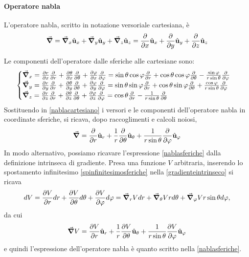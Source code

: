 \paragraph{Operatore nabla}
\begin{remember}
	L'operatore nabla, scritto in notazione versoriale cartesiana, è
	\begin{equation*}
		\grad =\grad_x\hat{\mathbf{u}}_x+\grad_y\hat{\mathbf{u}}_y+\grad_z\hat{\mathbf{u}}_z=\pdv{x}\hat{\mathbf{u}}_x+\pdv{y}\hat{\mathbf{u}}_y+\pdv{z}\hat{\mathbf{u}}_z
	\end{equation*}
\end{remember}
Le componenti dell'operatore dalle sferiche alle cartesiane sono:
\begin{equation}
	\begin{cases}
		\grad_x=\pdv{r}{x}\pdv{r}+\pdv{\theta}{x}\pdv{\theta}+\pdv{\varphi}{x}\pdv{\varphi}=\sin\theta\cos\varphi\pdv{r}+\cos\theta\cos\varphi\pdv{\theta}-\frac{\sin\varphi}{r\sin\theta}\pdv{\varphi}\\
		\grad_y=\pdv{r}{y}\pdv{r}+\pdv{\theta}{y}\pdv{\theta}+\pdv{\varphi}{y}\pdv{\varphi}=\sin\theta\sin\varphi\pdv{r}+\cos\theta\sin\varphi\pdv{\theta}+\frac{\cos\varphi}{r\sin\theta}\pdv{\varphi}\\
		\grad_z=\pdv{r}{z}\pdv{r}+\pdv{\theta}{z}\pdv{\theta}+\pdv{\varphi}{z}\pdv{\varphi}=\cos\theta\pdv{r}-\frac{1}{r\sin\theta}\pdv{\theta}\end{cases}
\end{equation}
Sostituendo in \ref{nablacartesiano} i versori e le componenti dell'operatore nabla in coordinate sferiche, si ricava, dopo raccoglimenti e calcoli noiosi,
\begin{equation}
	\grad=\pdv{r}\hat{\mathbf{u}}_r+\frac{1}{r}\pdv{\theta}\hat{\mathbf{u}}_\theta+\frac{1}{r\sin\theta}\pdv{\varphi}\hat{\mathbf{u}}_\varphi\label{nablasferiche}
\end{equation}
In modo alternativo, possiamo ricavare l'espressione \ref{nablasferiche} dalla definizione intrinseca di gradiente. Presa una funzione $V$ arbitraria, inserendo lo spostamento infinitesimo \ref{spinfinitesimosferiche} nella \ref{gradienteintrinseco} si ricava
\begin{equation*}
	dV=\pdv{V}{r}dr+\pdv{V}{\theta}d\theta+\pdv{V}{\varphi}d\varphi=\grad_r{V}dr+\grad_\theta{V}rd\theta+\grad_\varphi{V}r\sin\theta d\varphi,
\end{equation*}
da cui
\begin{equation}
	\grad{V}=\pdv{V}{r}\hat{\mathbf{u}}_r+\frac{1}{r}\pdv{V}{\theta}\hat{\mathbf{u}}_\theta+\frac{1}{r\sin\theta}\pdv{V}{\varphi}\hat{\mathbf{u}}_\varphi
\end{equation}
e quindi l'espressione dell'operatore nabla è quanto scritto nella \ref{nablasferiche}.
